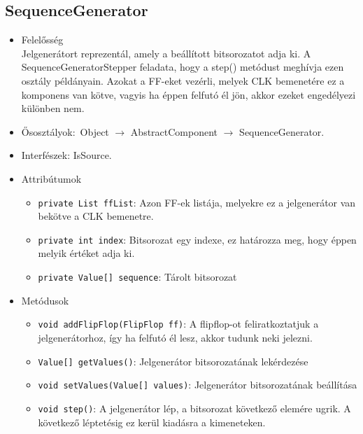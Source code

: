 \subsection{SequenceGenerator}
\begin{itemize}
\item Felelősség\\
Jelgenerátort reprezentál, amely a beállított bitsorozatot adja ki. A  SequenceGeneratorStepper feladata, hogy a step() metódust meghívja ezen osztály  példányain. Azokat a FF-eket vezérli, melyek CLK bemenetére ez a komponens van kötve,  vagyis ha éppen felfutó él jön, akkor ezeket engedélyezi különben nem.
\item Ősosztályok:\ Object $\rightarrow{}$ AbstractComponent $\rightarrow{}$ SequenceGenerator.
\item Interfészek: IsSource.
\item Attribútumok $\ $
\begin{itemize}
	\item \texttt{private List ffList}: Azon FF-ek listája, melyekre ez a jelgenerátor van bekötve a CLK bemenetre.
	\item \texttt{private int index}: Bitsorozat egy indexe, ez határozza meg, hogy éppen melyik értéket adja ki.
	\item \texttt{private Value[] sequence}: Tárolt bitsorozat
\end{itemize}
\item Metódusok$\ $
\begin{itemize}
	\item \texttt{void addFlipFlop(FlipFlop ff)}: A flipflop-ot feliratkoztatjuk a jelgenerátorhoz, így ha felfutó él lesz,  akkor tudunk neki jelezni.
	\item \texttt{Value[] getValues()}: Jelgenerátor bitsorozatának lekérdezése
	\item \texttt{void setValues(Value[] values)}: Jelgenerátor bitsorozatának beállítása
	\item \texttt{void step()}: A jelgenerátor lép, a bitsorozat következő elemére ugrik. A következő léptetésig  ez kerül kiadásra a kimeneteken.
\end{itemize}
\end{itemize}

